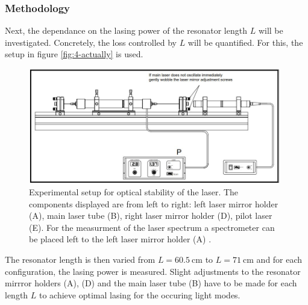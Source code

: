 \documentclass[../main.tex]{subfiles}
\begin{document}
    
\subsubsection*{Methodology}
    Next, the dependance on the lasing power of the resonator length $L$ will be investigated. Concretely, the loss controlled by $L$ will be quantified. For this, the setup in figure \ref{fig:4-actually} is used.
    
    \begin{figure}[H]
        \centering 
        \includegraphics[width = 11cm]{Bilddateien/4/4-Aufbau.jpg}
        \caption{Experimental setup for optical stability of the laser. The components displayed are from left to right: left laser mirror holder (A), main laser tube (B), right laser mirror holder (D), pilot laser (E). For the measurment of the laser spectrum a spectrometer can be placed left to the left laser mirror holder (A) \cite[p.22]{doc:HeNeStudentManual}.}
        \label{fig:4-Aufbau}
    \end{figure}

    \noindent The resonator length is then varied from $L = \SI{60.5}{\cm}$ to $L = \SI{71}{\cm}$ and for each configuration, the lasing power is measured. Slight adjustments to the resonator mirrror holders (A), (D) and the main laser tube (B) have to be made for each length $L$ to achieve optimal lasing for the occuring light modes.
\end{document}
